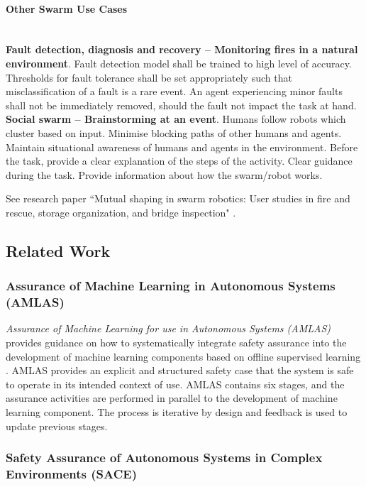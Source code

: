 \documentclass[lettersize,journal]{IEEEtran}
\begin{document}
\paragraph{Other Swarm Use Cases}
\textbf{\\Fault detection, diagnosis and recovery – Monitoring fires in a natural environment}. Fault detection model shall be trained to high level of accuracy. Thresholds for fault tolerance shall be set appropriately such that misclassification of a fault is a rare event. An agent experiencing minor faults shall not be immediately removed, should the fault not impact the task at hand. \\
\textbf{\noindent Social swarm – Brainstorming at an event}. Humans follow robots which cluster based on input. Minimise blocking paths of other humans and agents. Maintain situational awareness of humans and agents in the environment. Before the task, provide a clear explanation of the steps of the activity. Clear guidance during the task. Provide information about how the swarm/robot works.

\noindent See research paper ``Mutual shaping in swarm robotics: User studies in fire and rescue, storage organization, and bridge inspection" \cite{Carrillo-Zapata2020}.

\subsection{Related Work}\label{relatedwork}

\subsubsection{Assurance of Machine Learning in Autonomous Systems (AMLAS)}
\textit{Assurance of Machine Learning for use in Autonomous Systems (AMLAS)} provides guidance on how to systematically integrate safety assurance into the development of machine learning components based on offline supervised learning \cite{AMLAS2021}. 
AMLAS provides an explicit and structured safety case that the system is safe to operate in its intended context of use. 
AMLAS contains six stages, and the assurance activities are performed in parallel to the development of machine learning component. 
The process is iterative by design and feedback is used to update previous stages. 

\subsubsection{Safety Assurance of Autonomous Systems in Complex Environments (SACE)}
\cite{SACE2022}
\end{document}
